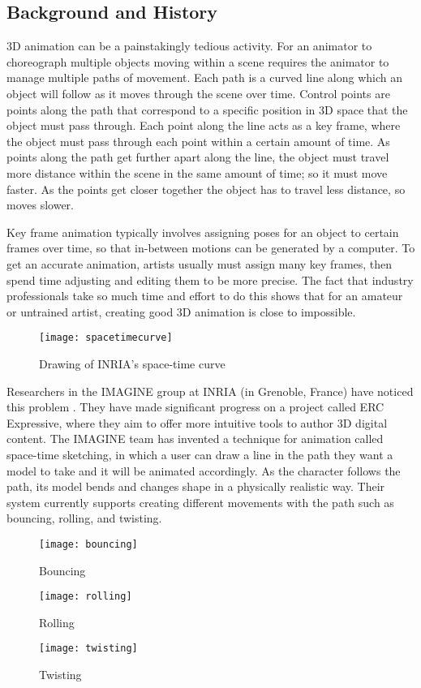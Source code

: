 \subsection{Background and History}
3D animation can be a painstakingly tedious activity. For an animator to choreograph multiple objects moving within a scene requires the animator to manage multiple paths of movement. Each path is a curved line along which an object will follow as it moves through the scene over time. Control points are points along the path that correspond to a specific position in 3D space that the object must pass through. Each point along the line acts as a key frame, where the object must pass through each point within a certain amount of time. As points along the path get further apart along the line, the object must travel more distance within the scene in the same amount of time; so it must move faster. As the points get closer together the object has to travel less distance, so moves slower.

Key frame animation typically involves assigning poses for an object to certain frames over time, so that in-between motions can be generated by a computer. To get an accurate animation, artists usually must assign many key frames, then spend time adjusting and editing them to be more precise. The fact that industry professionals take so much time and effort to do this shows that for an amateur or untrained artist, creating good 3D animation is close to impossible.

\begin{figure}[H]
\centering
\texttt{[image: spacetimecurve]}
\caption{Drawing of INRIA's space-time curve}
\label{fig:spaceTimeCurve}
\end{figure}

Researchers in the IMAGINE group at INRIA (in Grenoble, France) have noticed this problem \cite{hal}. They have made significant progress on a project called ERC Expressive, where they aim to offer more intuitive tools to author 3D digital content. The IMAGINE team has invented a technique for animation called space-time sketching, in which a user can draw a line in the path they want a model to take and it will be animated accordingly. As the character follows the path, its model bends and changes shape in a physically realistic way. Their system currently supports creating different movements with the path such as bouncing, rolling, and twisting.

\begin{figure}[!htb]
  \texttt{[image: bouncing]}
  \caption{Bouncing}\label{fig:bouncing}
\endminipage\hfill
{}
  \texttt{[image: rolling]}
  \caption{Rolling}\label{fig:rolling}
\endminipage\hfill
{}%
  \texttt{[image: twisting]}
  \caption{Twisting}\label{fig:twisting}
\endminipage
\end{figure}

